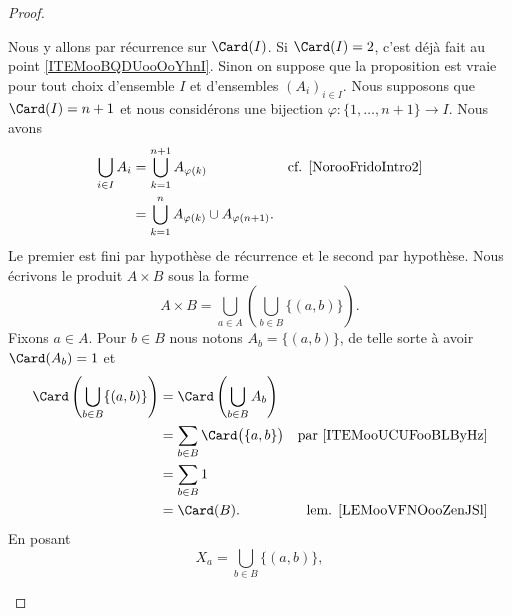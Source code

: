 \begin{proof}
\begin{subproof}
		Nous y allons par récurrence sur \( \Card(I)\). Si \( \Card(I)=2\), c'est déjà fait au point \ref{ITEMooBQDUooOoYhnI}. Sinon on suppose que la proposition est vraie pour tout choix d'ensemble \( I\) et d'ensembles \( (A_i)_{i\in I}\). Nous supposons que \( \Card(I)=n+1\) et nous considérons une bijection \(\varphi \colon \{ 1,\ldots,n+1 \}\to I  \). Nous avons
		\begin{subequations}
			\begin{align}
				\bigcup_{i\in I}A_i & =\bigcup_{k=1}^{n+1}A_{\varphi(k)}                   & \text{cf. \ref{NorooFridoIntro2}} \\
				                    & =\bigcup_{k=1}^nA_{\varphi(k)}\cup A_{\varphi(n+1)}.
			\end{align}
		\end{subequations}
		Le premier est fini par hypothèse de récurrence et le second par hypothèse.
		Nous écrivons le produit \( A\times B \) sous la forme
		\begin{equation}
			A\times B=\bigcup_{a\in A}\left( \bigcup_{b\in B}\{ (a,b) \} \right).
		\end{equation}
		Fixons \( a\in A\). Pour \( b\in B\) nous notons \( A_b=\{ (a,b) \}\), de telle sorte à avoir \( \Card(A_b)=1\) et
		\begin{subequations}
			\begin{align}
				\Card\left( \bigcup_{b\in B}\{ (a,b) \} \right) & =\Card\left( \bigcup_{b\in B}A_b \right)                                       \\
				                                                & =\sum_{b\in B}\Card\big( \{ a,b \} \big) & \text{par \ref{ITEMooUCUFooBLByHz}} \\
				                                                & =\sum_{b\in B}1                                                                \\
				                                                & =\Card(B).                               & \text{lem. \ref{LEMooVFNOooZenJSl}}
			\end{align}
		\end{subequations}
		En posant
		\begin{equation}
			X_a=\bigcup_{b\in B}\{ (a,b) \},
		\end{equation}

\end{subproof}
\end{proof}

